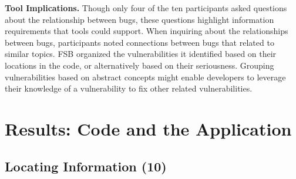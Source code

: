 \documentclass[conference]{IEEEtran}
\begin{document}

\noindent\textbf{Tool Implications.}
Though only four of the ten participants asked questions about the relationship between bugs, these questions highlight information requirements that tools could support.
When inquiring about the relationships between bugs, participants noted connections between bugs that related to similar topics.
FSB organized the vulnerabilities it identified based on their locations in the code, or alternatively based on their seriousness.
Grouping vulnerabilities based on abstract concepts might enable developers to leverage their knowledge of a vulnerability to fix other related vulnerabilities.




\section{Results: Code and the Application}
\label{sec:results-ca}





\noindent\subsection{\textbf{Locating Information (10)}}\label{li}
\end{document}
